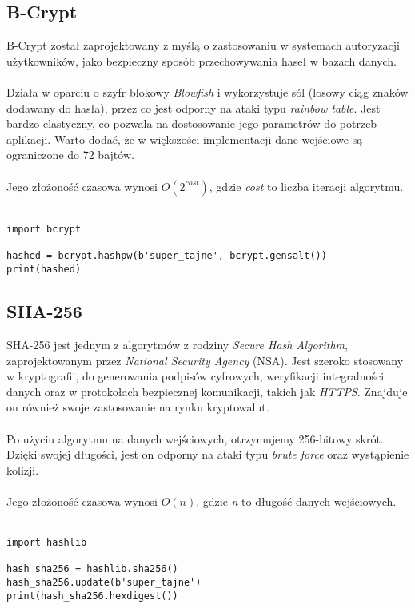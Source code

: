 \documentclass{article}
\begin{document}
    \subsection{B-Crypt}
    \label{subsection:b-crypt}
        B-Crypt został zaprojektowany z myślą o zastosowaniu w systemach autoryzacji użytkowników, jako bezpieczny sposób przechowywania haseł w bazach danych.
        \\
        \\
        Działa w oparciu o szyfr blokowy \textit{Blowfish} i wykorzystuje sól (losowy ciąg znaków dodawany do hasła), przez co jest odporny na ataki typu \textit{rainbow table}.
        Jest bardzo elastyczny, co pozwala na dostosowanie jego parametrów do potrzeb aplikacji.
        Warto dodać, że w większości implementacji dane wejściowe są ograniczone do 72 bajtów.
        \\
        \\
        Jego złożoność czasowa wynosi $O(2^{cost})$, gdzie \textit{cost} to liczba iteracji algorytmu.
        \\
        \\
\begin{lstlisting}[title=Przykładowa implementacja w języku Python, label=lst:b-crypt-example]
import bcrypt

hashed = bcrypt.hashpw(b'super_tajne', bcrypt.gensalt())
print(hashed)
\end{lstlisting}

    \subsection{SHA-256}
    \label{subsection:sha-256}
        SHA-256 jest jednym z algorytmów z rodziny \textit{Secure Hash Algorithm}, zaprojektowanym przez \textit{National Security Agency} (NSA).
        Jest szeroko stosowany w kryptografii, do generowania podpisów cyfrowych, weryfikacji integralności danych oraz w protokołach bezpiecznej komunikacji, takich jak \textit{HTTPS}.
        Znajduje on również swoje zastosowanie na rynku kryptowalut.
        \\
        \\
        Po użyciu algorytmu na danych wejściowych, otrzymujemy 256-bitowy skrót.
        Dzięki swojej długości, jest on odporny na ataki typu \textit{brute force} oraz wystąpienie kolizji.
        \\
        \\
        Jego złożoność czasowa wynosi $O(n)$, gdzie \textit{n} to długość danych wejściowych.
        \\
        \\
\begin{lstlisting}[title=Przykładowa implementacja w języku Python, label=lst:sha-256-example]
import hashlib

hash_sha256 = hashlib.sha256()
hash_sha256.update(b'super_tajne')
print(hash_sha256.hexdigest())
\end{lstlisting}
\end{document}

